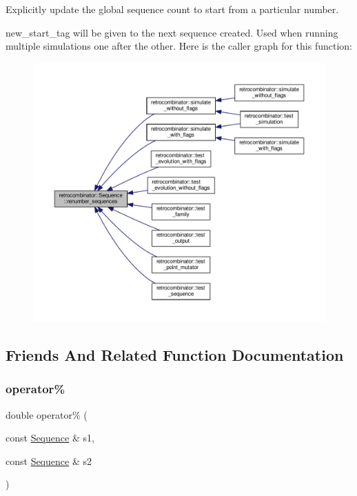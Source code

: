 Explicitly update the global sequence count to start from a particular number. 

new\+\_\+start\+\_\+tag will be given to the next sequence created. Used when running multiple simulations one after the other. Here is the caller graph for this function\+:
\nopagebreak
\begin{figure}[H]
\begin{center}
\leavevmode
\includegraphics[width=350pt]{classretrocombinator_1_1Sequence_ad4791ec3cefbea417081cd349ac6c23b_icgraph}
\end{center}
\end{figure}


\subsection{Friends And Related Function Documentation}
\mbox{\label{classretrocombinator_1_1Sequence_a951eb38b75bb0b9a808e3a8bc7170a09}} 
\subsubsection{\texorpdfstring{operator\%}{operator\%}\hspace{0.1cm}{\footnotesize\ttfamily [1/2]}}
{\footnotesize\ttfamily double operator\% (\begin{DoxyParamCaption}\item[{const \hyperlink{classretrocombinator_1_1Sequence}{Sequence} \&}]{s1,  }\item[{const \hyperlink{classretrocombinator_1_1Sequence}{Sequence} \&}]{s2 }\end{DoxyParamCaption})\hspace{0.3cm}{\ttfamily [friend]}}



